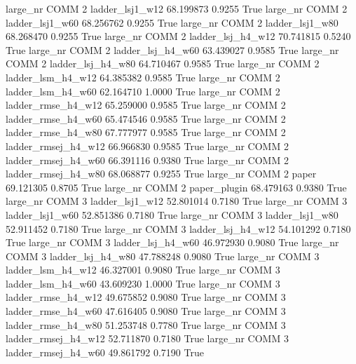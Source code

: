   large_nr     COMM                 2     ladder_lsj1_w12   68.199873      0.9255    True
  large_nr     COMM                 2     ladder_lsj1_w60   68.256762      0.9255    True
  large_nr     COMM                 2     ladder_lsj1_w80   68.268470      0.9255    True
  large_nr     COMM                 2   ladder_lsj_h4_w12   70.741815      0.5240    True
  large_nr     COMM                 2   ladder_lsj_h4_w60   63.439027      0.9585    True
  large_nr     COMM                 2   ladder_lsj_h4_w80   64.710467      0.9585    True
  large_nr     COMM                 2   ladder_lsm_h4_w12   64.385382      0.9585    True
  large_nr     COMM                 2   ladder_lsm_h4_w60   62.164710      1.0000    True
  large_nr     COMM                 2  ladder_rmse_h4_w12   65.259000      0.9585    True
  large_nr     COMM                 2  ladder_rmse_h4_w60   65.474546      0.9585    True
  large_nr     COMM                 2  ladder_rmse_h4_w80   67.777977      0.9585    True
  large_nr     COMM                 2 ladder_rmsej_h4_w12   66.966830      0.9585    True
  large_nr     COMM                 2 ladder_rmsej_h4_w60   66.391116      0.9380    True
  large_nr     COMM                 2 ladder_rmsej_h4_w80   68.068877      0.9255    True
  large_nr     COMM                 2               paper   69.121305      0.8705    True
  large_nr     COMM                 2        paper_plugin   68.479163      0.9380    True
  large_nr     COMM                 3     ladder_lsj1_w12   52.801014      0.7180    True
  large_nr     COMM                 3     ladder_lsj1_w60   52.851386      0.7180    True
  large_nr     COMM                 3     ladder_lsj1_w80   52.911452      0.7180    True
  large_nr     COMM                 3   ladder_lsj_h4_w12   54.101292      0.7180    True
  large_nr     COMM                 3   ladder_lsj_h4_w60   46.972930      0.9080    True
  large_nr     COMM                 3   ladder_lsj_h4_w80   47.788248      0.9080    True
  large_nr     COMM                 3   ladder_lsm_h4_w12   46.327001      0.9080    True
  large_nr     COMM                 3   ladder_lsm_h4_w60   43.609230      1.0000    True
  large_nr     COMM                 3  ladder_rmse_h4_w12   49.675852      0.9080    True
  large_nr     COMM                 3  ladder_rmse_h4_w60   47.616405      0.9080    True
  large_nr     COMM                 3  ladder_rmse_h4_w80   51.253748      0.7780    True
  large_nr     COMM                 3 ladder_rmsej_h4_w12   52.711870      0.7180    True
  large_nr     COMM                 3 ladder_rmsej_h4_w60   49.861792      0.7190    True
